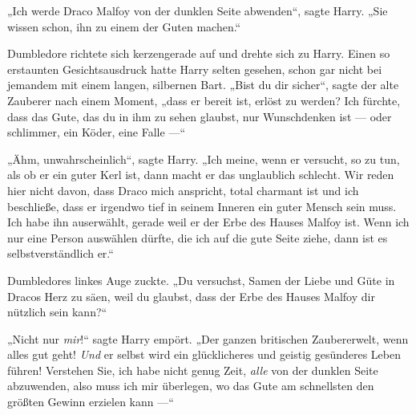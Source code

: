 „Ich werde Draco Malfoy von der dunklen Seite abwenden“, sagte Harry.
„Sie wissen schon, ihn zu einem der Guten machen.“

Dumbledore richtete sich kerzengerade auf und drehte sich zu Harry. Einen so erstaunten Gesichtsausdruck hatte Harry selten gesehen, schon gar nicht bei jemandem mit einem langen, silbernen Bart.
„Bist du dir sicher“, sagte der alte Zauberer nach einem Moment, „dass er bereit ist, erlöst zu werden? Ich fürchte, dass das Gute, das du in ihm zu sehen glaubst, nur Wunschdenken ist — oder schlimmer, ein Köder, eine Falle —“

„Ähm, unwahrscheinlich“, sagte Harry.
„Ich meine, wenn er versucht, so zu tun, als ob er ein guter Kerl ist, dann macht er das unglaublich schlecht. Wir reden hier nicht davon, dass Draco mich anspricht, total charmant ist und ich beschließe, dass er irgendwo tief in seinem Inneren ein guter Mensch sein muss. Ich habe ihn auserwählt, gerade weil er der Erbe des Hauses Malfoy ist. Wenn ich nur eine Person auswählen dürfte, die ich auf die gute Seite ziehe, dann ist es selbstverständlich er.“

Dumbledores linkes Auge zuckte.
„Du versuchst, Samen der Liebe und Güte in Dracos Herz zu säen, weil du glaubst, dass der Erbe des Hauses Malfoy dir nützlich sein kann?“

„Nicht nur \emph{mir}!“ sagte Harry empört.
„Der ganzen britischen Zaubererwelt, wenn alles gut geht! \emph{Und} er selbst wird ein glücklicheres und geistig gesünderes Leben führen! Verstehen Sie, ich habe nicht genug Zeit, \emph{alle} von der dunklen Seite abzuwenden, also muss ich mir überlegen, wo das Gute am schnellsten den größten Gewinn erzielen kann —“

